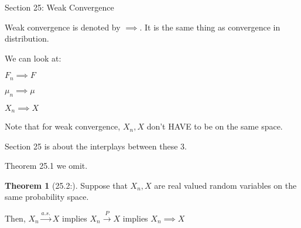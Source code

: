 \documentclass{article}
\theoremstyle{definition}
\newtheorem{theorem}{Theorem}
\begin{document}
Section 25: Weak Convergence

Weak convergence is denoted by \(\implies\). It is the same thing as convergence in distribution.

We can look at:

\(F_n \implies F\)

\(\mu_n \implies \mu\)

\(X_n \implies X\) 

Note that for weak convergence, \(X_n,X\) don't HAVE to be on the same space.

Section 25 is about the interplays between these 3.

Theorem 25.1 we omit.

\begin{theorem}
    [25.2:] Suppose that \(X_n,X\) are real valued random variables on the same probability space.

    Then, \(X_n \overset{a.s.}{\to} X\) implies \(X_n \overset{P}{\to} X\) implies \(X_n \implies X\)  

\end{theorem}
\end{document}
